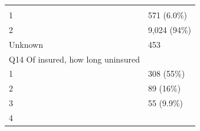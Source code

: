 \documentclass[]{article}
\begin{document}
\begin{longtable}[]{@{}ll@{}}
\begin{minipage}[t]{0.23\columnwidth}
\strut
\end{minipage}\tabularnewline
\begin{minipage}[t]{0.71\columnwidth}\raggedright
1\strut
\end{minipage} & \begin{minipage}[t]{0.23\columnwidth}\raggedright
571 (6.0\%)\strut
\end{minipage}\tabularnewline
\begin{minipage}[t]{0.71\columnwidth}\raggedright
2\strut
\end{minipage} & \begin{minipage}[t]{0.23\columnwidth}\raggedright
9,024 (94\%)\strut
\end{minipage}\tabularnewline
\begin{minipage}[t]{0.71\columnwidth}\raggedright
Unknown\strut
\end{minipage} & \begin{minipage}[t]{0.23\columnwidth}\raggedright
453\strut
\end{minipage}\tabularnewline
\begin{minipage}[t]{0.71\columnwidth}\raggedright
Q14 Of insured, how long uninsured\strut
\end{minipage} & \begin{minipage}[t]{0.23\columnwidth}\raggedright
\strut
\end{minipage}\tabularnewline
\begin{minipage}[t]{0.71\columnwidth}\raggedright
1\strut
\end{minipage} & \begin{minipage}[t]{0.23\columnwidth}\raggedright
308 (55\%)\strut
\end{minipage}\tabularnewline
\begin{minipage}[t]{0.71\columnwidth}\raggedright
2\strut
\end{minipage} & \begin{minipage}[t]{0.23\columnwidth}\raggedright
89 (16\%)\strut
\end{minipage}\tabularnewline
\begin{minipage}[t]{0.71\columnwidth}\raggedright
3\strut
\end{minipage} & \begin{minipage}[t]{0.23\columnwidth}\raggedright
55 (9.9\%)\strut
\end{minipage}\tabularnewline
\begin{minipage}[t]{0.71\columnwidth}\raggedright
4\strut
\end{minipage} & \begin{minipage}[t]{0.23\columnwidth}\raggedright

\end{minipage}
\end{longtable}
\end{document}
